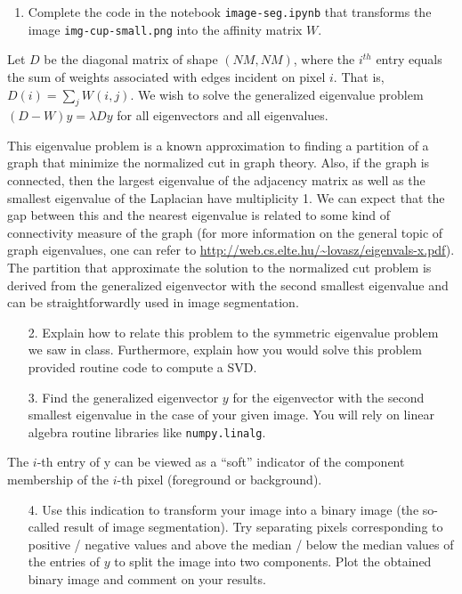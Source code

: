 \documentclass[11pt]{article}
\begin{document}
\begin{enumerate}
    \item Complete the code in the notebook \texttt{image-seg.ipynb} that transforms the image \texttt{img-cup-small.png} into the affinity matrix $W$.
\end{enumerate}

Let $D$ be the diagonal matrix of shape $(NM, NM)$, where the $i^{th}$ entry equals the sum of weights associated with edges incident on pixel $i$. That is, $D(i) = \sum_{j} W(i, j)$. We wish to solve the generalized eigenvalue problem $(D - W)y = \lambda Dy$ for all eigenvectors and all eigenvalues.

This eigenvalue problem is a known approximation to finding a partition of a graph that minimize the normalized cut in graph theory. Also, if the graph is connected, then the largest eigenvalue of the adjacency matrix as well as the smallest eigenvalue of the Laplacian have multiplicity 1. We can expect that the gap between this and the nearest eigenvalue is related to some kind of connectivity measure of the graph (for more information on the general topic of graph eigenvalues, one can refer to \url{http://web.cs.elte.hu/~lovasz/eigenvals-x.pdf}). The partition that approximate the solution to the normalized cut problem is derived from the generalized eigenvector with the second smallest eigenvalue and can be straightforwardly used in image segmentation.

\begin{enumerate}
    \item[2.] Explain how to relate this problem to the symmetric eigenvalue problem we saw in class. Furthermore, explain how you would solve this problem provided routine code to compute a SVD.
\end{enumerate}

\begin{enumerate}
    \item[3.] Find the generalized eigenvector $y$ for the eigenvector with the second smallest eigenvalue in the case of your given image. You will rely on linear algebra routine libraries like \texttt{numpy.linalg}.
\end{enumerate}



The $i$-th entry of y can be viewed as a “soft” indicator of the component membership of the $i$-th pixel (foreground or background).

\begin{enumerate}

\item[4.] Use this indication to transform your image into a binary image (the so-called result of image segmentation). Try separating pixels corresponding to positive / negative values and above the median / below the median values of the entries of $y$ to split the image into two components. Plot the obtained binary image and comment on your results.

\end{enumerate}
\end{document}
